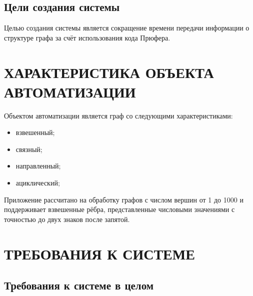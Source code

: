 \documentclass[12pt,a4paper]{article}
\begin{document}
\subsection{Цели создания системы}
Целью создания системы является сокращение времени передачи информации о структуре графа за счёт использования 
кода Прюфера.

\newpage
\section{ХАРАКТЕРИСТИКА ОБЪЕКТА АВТОМАТИЗАЦИИ}
Объектом автоматизации является граф со следующими характеристиками:
\begin{itemize}
    \item взвешенный;
    \item связный;
    \item направленный;
    \item ациклический;
\end{itemize}

\medskip Приложение рассчитано на обработку графов с числом вершин от 1 до 1000 и поддерживает взвешенные рёбра, 
представленные числовыми значениями с точностью до двух знаков после запятой.

\newpage
\section{ТРЕБОВАНИЯ К СИСТЕМЕ}
\subsection{Требования к системе в целом}
\end{document}
